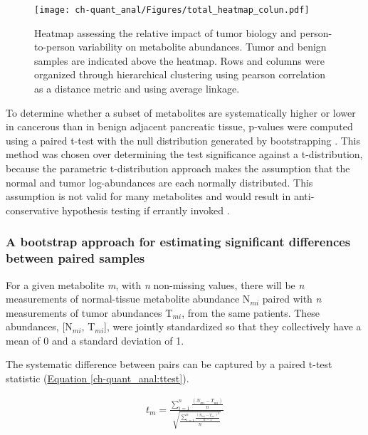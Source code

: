\begin{figure}[h!]
\begin{center}
\texttt{[image: ch-quant\_anal/Figures/total\_heatmap\_colun.pdf]}
\caption[Heatmap assessing the relative impact of tumor biology and person-to-person variability on metabolite abundances.]{Heatmap assessing the relative impact of tumor biology and person-to-person variability on metabolite abundances.  Tumor and benign samples are indicated above the heatmap.  Rows and columns were organized through hierarchical clustering using pearson correlation as a distance metric and using average linkage.}
\label{ch-quant_anal:all_sample_heatmap}
\end{center}
\end{figure}

To determine whether a subset of metabolites are systematically higher or lower in cancerous than in benign adjacent pancreatic tissue, p-values were computed using a paired t-test with the null distribution generated by bootstrapping \cite{Efron:1986cv}.  This method was chosen over determining the test significance against a t-distribution, because the parametric t-distribution approach makes the assumption that the normal and tumor log-abundances are each normally distributed.  This assumption is not valid for many metabolites and would result in anti-conservative hypothesis testing if errantly invoked \cite{Schmoyeri:1996uh}.

\subsubsection{A bootstrap approach for estimating significant differences between paired samples}

For a given metabolite \textit{m}, with \textit{n} non-missing values, there will be \textit{n} measurements of normal-tissue metabolite abundance N$_{mi}$ paired with \textit{n} measurements of tumor abundances T$_{mi}$, from the same patients.  These abundances, [N$_{mi}$, T$_{mi}$], were jointly standardized so that they collectively have a mean of 0 and a standard deviation of 1.  

The systematic difference between pairs can be captured by a paired t-test statistic (\hyperref[ch-quant_anal:ttest]{Equation \ref{ch-quant_anal:ttest}}).

\begin{align}
t_{m} = \frac{\sum_{i = 1}^{n}\frac{(N_{mi} - T_{mi})}{n}}{\sqrt{\frac{\sum_{i = 1}^{n}\frac{(N_{mi} - T_{mi})^{2}}{n-1}}{n}}}\label{ch-quant_anal:ttest}
\end{align}

